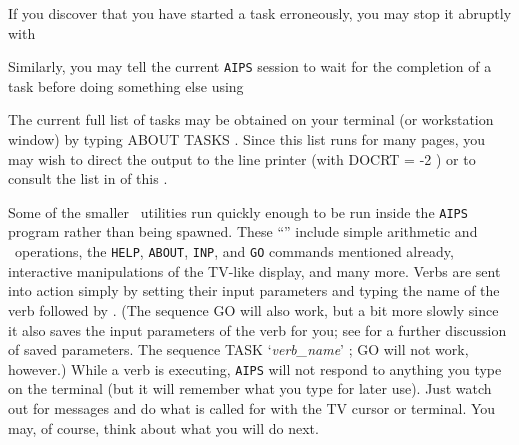      If you discover that you have started a task erroneously, you may
stop it abruptly with
\btd
{}
\etd
{}

     Similarly, you may tell the current {\tt AIPS} session to wait
for the completion of a task before doing something else using
\btd
{}
\etd
{}

     The current full list of tasks may be obtained on your terminal
(or workstation window) by typing {\us ABOUT \qs TASKS \hbox{\CR}}.
Since this list runs for many pages, you may wish to direct the output
to the line printer (with {\us DOCRT = -2 \CR}) or to consult the
list in  of this \Cookbook.


     Some of the smaller \AIPS\ utilities run quickly enough to be run
inside the {\tt AIPS} program rather than being spawned.  These
``'' include simple arithmetic and \POPS\
operations, the {\tt HELP}, {\tt ABOUT}, {\tt INP}, and {\tt GO}
commands mentioned already, interactive manipulations of the TV-like
display, and many more.  Verbs are sent into action simply by setting
their input parameters and typing the name of the verb followed by
\hbox{\CR}. (The sequence {\us GO \qs {\it verb\_name\/} \CR} will also
work, but a bit more slowly since it also saves the input parameters
of the verb for you; see \Sec{inputs} for a further discussion of saved
parameters. The sequence {\us TASK \qs `{\it verb\_name\/}' ;  \qs GO
\CR} will not work, however.)  While a verb is executing, {\tt AIPS}
will not respond to anything you type on the terminal (but it will
remember what you type for later use).  Just watch out for messages
and do what is called for with the TV cursor or terminal.  You may, of
course, think about what you will do next.

